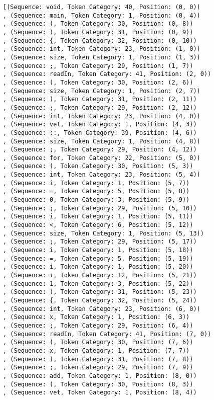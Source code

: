\documentclass[a4paper, 12pt, article]{memoir}
\begin{document}
\begin{lstlisting}
[(Sequence: void, Token Category: 40, Position: (0, 0))
, (Sequence: main, Token Category: 1, Position: (0, 4))
, (Sequence: (, Token Category: 30, Position: (0, 8))
, (Sequence: ), Token Category: 31, Position: (0, 9))
, (Sequence: {, Token Category: 32, Position: (0, 10))
, (Sequence: int, Token Category: 23, Position: (1, 0))
, (Sequence: size, Token Category: 1, Position: (1, 3))
, (Sequence: ;, Token Category: 29, Position: (1, 7))
, (Sequence: readIn, Token Category: 41, Position: (2, 0))
, (Sequence: (, Token Category: 30, Position: (2, 6))
, (Sequence: size, Token Category: 1, Position: (2, 7))
, (Sequence: ), Token Category: 31, Position: (2, 11))
, (Sequence: ;, Token Category: 29, Position: (2, 12))
, (Sequence: int, Token Category: 23, Position: (4, 0))
, (Sequence: vet, Token Category: 1, Position: (4, 3))
, (Sequence: ::, Token Category: 39, Position: (4, 6))
, (Sequence: size, Token Category: 1, Position: (4, 8))
, (Sequence: ;, Token Category: 29, Position: (4, 12))
, (Sequence: for, Token Category: 22, Position: (5, 0))
, (Sequence: (, Token Category: 30, Position: (5, 3))
, (Sequence: int, Token Category: 23, Position: (5, 4))
, (Sequence: i, Token Category: 1, Position: (5, 7))
, (Sequence: =, Token Category: 5, Position: (5, 8))
, (Sequence: 0, Token Category: 3, Position: (5, 9))
, (Sequence: ;, Token Category: 29, Position: (5, 10))
, (Sequence: i, Token Category: 1, Position: (5, 11))
, (Sequence: <, Token Category: 6, Position: (5, 12))
, (Sequence: size, Token Category: 1, Position: (5, 13))
, (Sequence: ;, Token Category: 29, Position: (5, 17))
, (Sequence: i, Token Category: 1, Position: (5, 18))
, (Sequence: =, Token Category: 5, Position: (5, 19))
, (Sequence: i, Token Category: 1, Position: (5, 20))
, (Sequence: +, Token Category: 12, Position: (5, 21))
, (Sequence: 1, Token Category: 3, Position: (5, 22))
, (Sequence: ), Token Category: 31, Position: (5, 23))
, (Sequence: {, Token Category: 32, Position: (5, 24))
, (Sequence: int, Token Category: 23, Position: (6, 0))
, (Sequence: x, Token Category: 1, Position: (6, 3))
, (Sequence: ;, Token Category: 29, Position: (6, 4))
, (Sequence: readIn, Token Category: 41, Position: (7, 0))
, (Sequence: (, Token Category: 30, Position: (7, 6))
, (Sequence: x, Token Category: 1, Position: (7, 7))
, (Sequence: ), Token Category: 31, Position: (7, 8))
, (Sequence: ;, Token Category: 29, Position: (7, 9))
, (Sequence: add, Token Category: 1, Position: (8, 0))
, (Sequence: (, Token Category: 30, Position: (8, 3))
, (Sequence: vet, Token Category: 1, Position: (8, 4))

\end{lstlisting}
\end{document}
